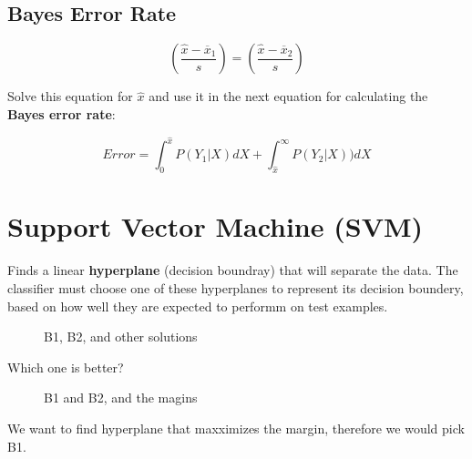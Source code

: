 		\subsection{Bayes Error Rate}

			\begin{equation}
				(\frac{\hat{x} - \overline{x}_1}{s}) = (\frac{\hat{x} - \overline{x}_2}{s} )
			\end{equation}

			Solve this equation for $\hat{x}$ and use it in the next equation for calculating
			the {\bf Bayes error rate}:

			\begin{equation}
				Error = \int_{0}^{\hat{x}} P(Y_{1}|X) dX + \int_{\hat{x}}^{\infty} P(Y_{2}|X)) dX
			\end{equation}

	\section{Support Vector Machine (SVM)}

		Finds a linear {\bf hyperplane} (decision boundray) that will separate the data. 
		The classifier must choose one of these hyperplanes to represent its decision
		boundery, based on how well they are expected to performm on test examples. 

		\begin{figure}[H]
			\caption{B1, B2, and other solutions}
		\end{figure}

		Which one is better?

		\begin{figure}[H]
			\caption{B1 and B2, and the magins}
		\end{figure}

		We want to find hyperplane that maxximizes the margin, therefore we would pick B1. 


